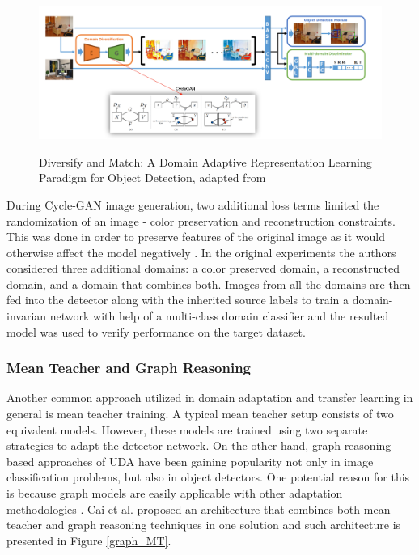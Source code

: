 \documentclass[english, 12pt, a4paper, elec, utf8, a-1b, online]{aaltothesis}
\begin{document}
\begin{figure}[htb]
	\begin{center}
		\includegraphics[width=16cm]{./diversify.png}
	\end{center}
	\caption{Diversify and Match: A Domain Adaptive Representation Learning Paradigm for Object Detection, adapted from \cite{Kim2019}}
	\begin{center}
		\label{diversify}
	\end{center}
\end{figure}
\FloatBarrier

During Cycle-GAN image generation, two additional loss terms limited the  randomization of an image - color preservation and reconstruction constraints. This was done in order to preserve features of the original image as it would otherwise affect the model negatively \cite{Oza2021}. In the original experiments the authors considered three additional domains: a color preserved domain, a reconstructed domain, and a domain that combines both. Images from all the domains are then fed into the detector along with the inherited source labels   to train a domain-invarian network with help of a multi-class domain classifier and the resulted model was used to verify performance on the target dataset. 

\subsubsection{Mean Teacher and Graph Reasoning}
\label{mean_teacher} 
Another common approach utilized in domain adaptation and transfer learning in general is mean teacher training. A typical mean teacher setup consists of two equivalent models. However, these models are trained using two separate strategies to adapt the detector network. On the other hand, graph reasoning based approaches of UDA have been gaining popularity not only in image classification problems, but also in object detectors. One potential reason for this is because graph models are easily applicable with other adaptation methodologies \cite{Oza2021}. Cai et al. \cite{Cai2019} proposed an architecture that combines both mean teacher and graph reasoning techniques in one solution and such architecture is presented in Figure \ref{graph_MT}. 
 
\end{document}

